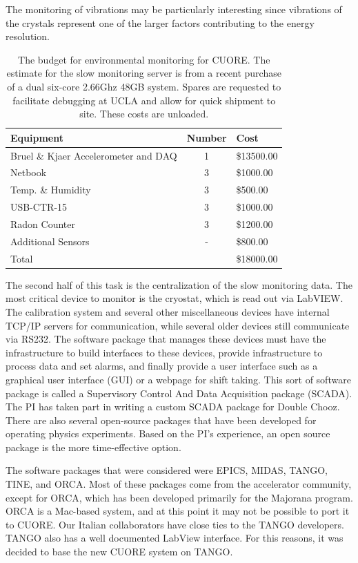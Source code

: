 The monitoring of vibrations may be particularly interesting since vibrations of the crystals represent one of the larger factors contributing to the energy resolution\cite{vignati}.

\begin{table}[position specifier]
\begin{center}
\begin{tabular}{ l c l}
\hline
Equipment & Number & Cost \\
\hline
Bruel \& Kjaer Accelerometer and DAQ & 1 & \$13500.00 \\
Netbook & 3 & \$1000.00\\
Temp. \& Humidity & 3 & \$500.00 \\
USB-CTR-15 & 3 & \$1000.00\\
Radon Counter & 3 & \$1200.00\\
Additional Sensors & - & \$800.00 \\
\hline
Total & & \$18000.00 \\
\hline
\end{tabular}
\caption{\label{slowRequest}The budget for environmental monitoring for CUORE. The estimate for the slow monitoring server is from a recent purchase of a dual six-core 2.66Ghz 48GB system. Spares are requested to facilitate debugging at UCLA and allow for quick shipment to site. These costs are unloaded.}
\end{center}
\end{table}

The second half of this task is the centralization of the slow monitoring data. The most critical device to monitor is the cryostat, which is read out via LabVIEW. The calibration system and several other miscellaneous devices have internal TCP/IP servers for communication, while several older devices still communicate via RS232. The software package that manages these devices must have the infrastructure to build interfaces to these devices, provide infrastructure to process data and set alarms, and finally provide a user interface such as a graphical user interface (GUI) or a webpage for shift taking. This sort of software package is called a Supervisory Control And Data Acquisition package (SCADA). The PI has taken part in writing a custom SCADA package for Double Chooz. There are also several open-source packages that have been developed for operating physics experiments. Based on the PI's experience, an open source package is the more time-effective option.

The software packages that were considered were  EPICS\cite{epics}, MIDAS\cite{midas}, TANGO\cite{tango}, TINE\cite{tine}, and ORCA\cite{orca}.  Most of these packages come from the accelerator community, except for ORCA, which has been developed primarily for the Majorana program. ORCA is a Mac-based system, and at this point it may not be possible to port it to CUORE.  Our Italian collaborators have close ties to the TANGO developers. TANGO also has a well documented LabView interface. For this reasons, it was decided to base the new CUORE system on TANGO.

